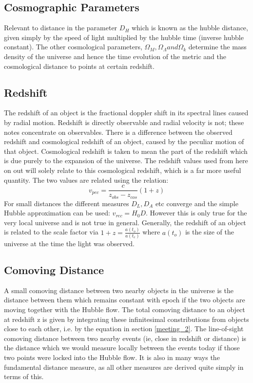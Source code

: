 \documentclass{literature}
\begin{document}
\subsection{Cosmographic Parameters}
Relevant to distance in the parameter $D_{H}$ which is known as the hubble distance, given simply by the speed of light multiplied by the hubble time (inverse hubble constant). The other cosmological parameters, $\Omega_{M}, \Omega_{\Lambda} and \Omega_{k}$ determine the mass density of the universe and hence the time evolution of the metric and the cosmological distance to points at certain redshift.
\subsection{Redshift}\label{subs:redshift}
The redshift of an object is the fractional doppler shift in its spectral lines caused by radial motion. Redshift is directly observable and radial velocity is not; these notes concentrate on observables. There is a difference between the observed redshift and cosmological redshift of an object, caused by the peculiar motion of that object. Cosmological redshift is taken to mean the part of the redshift which is due purely to the expansion of the universe. The redshift values used from here on out will solely relate to this cosmological redshift, which is a far more useful quantity. The two values are related using the relation: 
\begin{equation}
v_{pec} = \frac c{z_{obs} - z_{cos}}{(1 + z)}	
\end{equation}
For small distances the different measures $D_{L}, D_{A}$ etc converge and the simple Hubble approximation can be used: $v_{rec} = H_{0}D$. However this is only true for the very local universe and is not true in general. Generally, the redshift of an object is related to the scale factor via $1 + z = \frac{a(t_{o})}{a(t_{e})}$ where $a(t_{o})$ is the size of the universe at the time the light was observed.
\subsection{Comoving Distance}\label{subs:comoving_distance}
A small comoving distance between two nearby objects in the universe is the distance between them which remains constant with epoch if the two objects are moving together with the Hubble flow. The total comoving distance to an object at redshift z is given by integrating these infinitesimal constributions from objects close to each other, i.e. by the equation in section \ref{meeting_2}. The line-of-sight comoving distance between two nearby events (ie, close in redshift or distance) is the distance which we would measure locally between the events today if those two points were locked into the Hubble flow. It is also in many ways the fundamental distance measure, as all other measures are derived quite simply in terms of this. 
\end{document}

